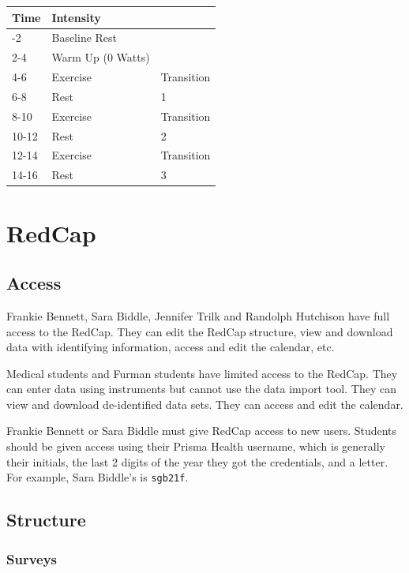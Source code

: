 \documentclass[
]{book}
\begin{document}
\begin{longtable}[]{@{}lll@{}}
\toprule\noalign{}
Time & Intensity & \\
\midrule\noalign{}
\endhead
\bottomrule\noalign{}
\endlastfoot
0-2 & Baseline Rest & \\
2-4 & Warm Up (0 Watts) & \\
4-6 & Exercise & Transition \\
6-8 & Rest & 1 \\
8-10 & Exercise & Transition \\
10-12 & Rest & 2 \\
12-14 & Exercise & Transition \\
14-16 & Rest & 3 \\
\end{longtable}

\hypertarget{RedCap}{%
\chapter{RedCap}\label{RedCap}}

\hypertarget{RedCap-Access}{%
\section{Access}\label{RedCap-Access}}

Frankie Bennett, Sara Biddle, Jennifer Trilk and Randolph Hutchison have full access to the RedCap. They can edit the RedCap structure, view and download data with identifying information, access and edit the calendar, etc.

Medical students and Furman students have limited access to the RedCap. They can enter data using instruments but cannot use the data import tool. They can view and download de-identified data sets. They can access and edit the calendar.

Frankie Bennett or Sara Biddle must give RedCap access to new users. Students should be given access using their Prisma Health username, which is generally their initials, the last 2 digits of the year they got the credentials, and a letter. For example, Sara Biddle's is \texttt{sgb21f}.

\hypertarget{RedCap-Structure}{%
\section{Structure}\label{RedCap-Structure}}

\hypertarget{RedCap-Surveys}{%
\subsection{Surveys}\label{RedCap-Surveys}}
\end{document}
